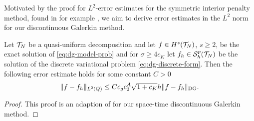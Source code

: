 \documentclass[../thesis.tex]{subfiles}
\begin{document}
Motivated by the proof for $L^2$-error estimates for the symmetric interior penalty method, found in for example \cite[Theorem 4.25]{DiPietroErn}, we aim to derive error estimates in the $L^2$ norm for our discontinuous Galerkin method.
\begin{theorem}
\label{thm:dg-L2-estimate}
Let $\mathcal{T}_N$ be a quasi-uniform decomposition and let $f \in H^s(\mathcal{T}_N)$, $s \geq 2$, be the exact solution of \cref{eq:dg-model-prob} and for $\sigma \geq 4 c_K$ let $f_h \in \mathcal{S}_h^p(\mathcal{T}_N)$ be the solution of the discrete variational problem \cref{eq:dg-discrete-form}.
Then the following error estimate holds for some constant $C > 0$
\[
	\| f - f_h \|_{L^2(Q)} \leq C c_g c_2^A \sqrt{1 + c_K} h \| f - f_h \|_{\mathrm{DG}}.
\]
\end{theorem}
\begin{proof}
This proof is an adaption of \cite[Theorem 4.25]{DiPietroErn} for our space-time discontinuous Galerkin method.


\end{proof}
\end{document}
